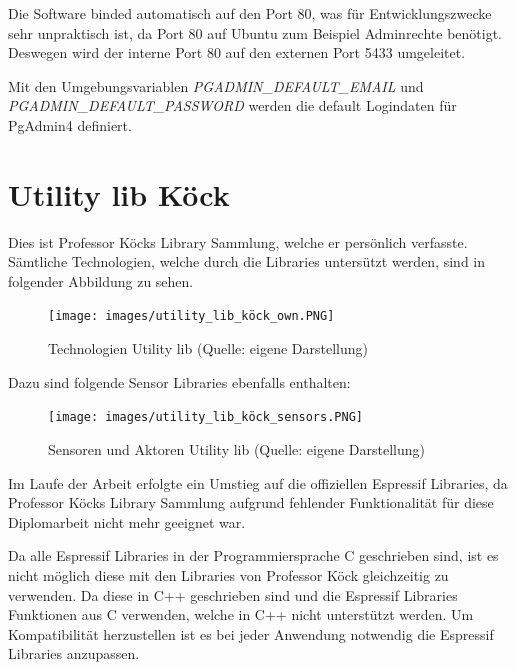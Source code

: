 Die Software binded automatisch auf den Port 80, was für Entwicklungszwecke sehr unpraktisch ist, da Port 80 auf Ubuntu zum Beispiel Adminrechte benötigt. Deswegen wird der interne Port 80 auf den externen Port 5433 umgeleitet.

Mit den Umgebungsvariablen \textit{PGADMIN\_DEFAULT\_EMAIL} und 
\textit{PGADMIN\_DEFAULT\_PASSWORD} werden die default Logindaten für PgAdmin4 definiert. 
\pagebreak

\section{Utility lib Köck}\label{sec:utility-lib-koeck}
Dies ist Professor Köcks Library Sammlung, welche er persönlich verfasste. Sämtliche Technologien, welche durch die Libraries untersützt werden, sind in folgender Abbildung zu sehen.

\begin{figure}[H]
    \begin{center}
        \texttt{[image: images/utility\_lib\_köck\_own.PNG]}
        \caption{Technologien Utility lib (Quelle: eigene Darstellung)}
    \end{center}
\end{figure}

\pagebreak
Dazu sind folgende Sensor Libraries ebenfalls enthalten:

\begin{figure}[H]
    \begin{center}
        \texttt{[image: images/utility\_lib\_köck\_sensors.PNG]}
        \caption{Sensoren und Aktoren Utility lib (Quelle: eigene Darstellung)}
    \end{center}
\end{figure}

Im Laufe der Arbeit erfolgte ein Umstieg auf die offiziellen Espressif Libraries, da Professor Köcks Library Sammlung aufgrund fehlender Funktionalität für diese Diplomarbeit nicht mehr geeignet war.

Da alle Espressif Libraries in der Programmiersprache C geschrieben sind, ist es nicht möglich diese mit den Libraries von Professor Köck gleichzeitig zu verwenden. Da diese in C++ geschrieben sind und die Espressif Libraries Funktionen aus C verwenden, welche in C++ nicht unterstützt werden. Um Kompatibilität herzustellen ist es bei jeder Anwendung notwendig die Espressif Libraries anzupassen.